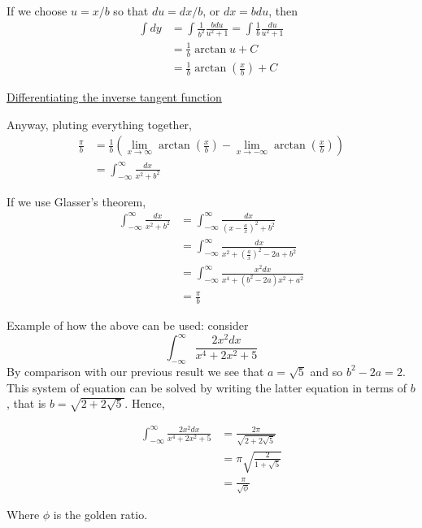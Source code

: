 If we choose $u = x/b$ so that $du = dx /b$, or $dx = b du$, then
\begin{align*}
\int dy &= \int \frac{1}{b^2} \frac{b du}{u^2 + 1 } = \int \frac{1}{b} \frac{du}{u^2 + 1} \\
&= \frac{1}{b} \arctan u + C \\
&= \frac{1}{b} \arctan\left(\frac{x}{b}\right) + C
\end{align*}

\href{https://en.wikipedia.org/wiki/Differentiation_of_trigonometric_functions#Differentiating_the_inverse_tangent_function}{Differentiating the inverse tangent function}

Anyway, pluting everything together,
\begin{align*}
\frac{\pi}{b} &= \frac{1}{b}
    \left( \lim_{x\rightarrow\infty} \arctan\left(\frac{x}{b}\right) -
    \lim_{x\rightarrow -\infty} \arctan\left(\frac{x}{b}\right) \right) \\
&= \int_{-\infty}^{\infty} \frac{dx}{x^2 + b^2}
\end{align*}

If we use Glasser's theorem,
\begin{align*}
\int_{-\infty}^{\infty} \frac{dx}{x^2 + b^2} &= \int_{-\infty}^{\infty} \frac{dx}{\left(x - \frac{a}{x}\right)^2 + b^2} \\
&= \int_{-\infty}^{\infty} \frac{dx}{x^2 + \left(\frac{a}{x}\right)^2 - 2a + b^2} \\
&= \int_{-\infty}^{\infty} \frac{x^2 dx}{x^4 + \left(b^2 - 2a\right) x^2 + a^2 } \\
&= \frac{\pi}{b}
\end{align*}

Example of how the above can be used: consider
$$
\int_{-\infty}^{\infty} \frac{2x^2 dx}{x^4 + 2x^2 + 5}
$$
By comparison with our previous result we see that $a = \sqrt{5}$
and so $b^2 - 2a = 2$.
This system of equation can be solved by writing the latter equation in terms of $b$, that is
$b = \sqrt{2 + 2\sqrt{5}}$.
Hence,

\begin{align*}
\int_{-\infty}^{\infty} \frac{2x^2 dx}{x^4 + 2x^2 + 5} &= \frac{2\pi}{\sqrt{2 + 2\sqrt{5}}} \\
&= \pi \sqrt{ \frac{2}{1 + \sqrt{5}} } \\
&= \frac{\pi}{\sqrt{\phi}}
\end{align*}

Where $\phi$ is the golden ratio.